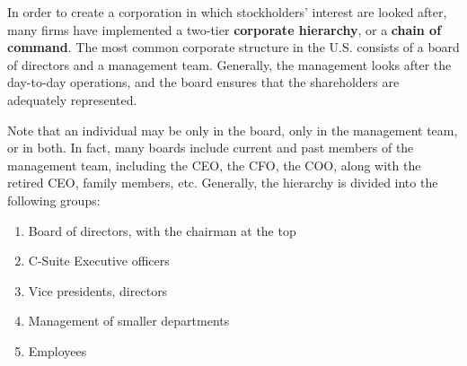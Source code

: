 \documentclass{article}
\begin{document}
    In order to create a corporation in which stockholders' interest are looked after, many firms have implemented a two-tier \textbf{corporate hierarchy}, or a \textbf{chain of command}. The most common corporate structure in the U.S. consists of a board of directors and a management team. Generally, the management looks after the day-to-day operations, and the board ensures that the shareholders are adequately represented. 

    Note that an individual may be only in the board, only in the management team, or in both. In fact, many boards include current and past members of the management team, including the CEO, the CFO, the COO, along with the retired CEO, family members, etc. Generally, the hierarchy is divided into the following groups: 
    \begin{enumerate}
      \item Board of directors, with the chairman at the top
      \item C-Suite Executive officers
      \item Vice presidents, directors 
      \item Management of smaller departments
      \item Employees
    \end{enumerate}
\end{document}
